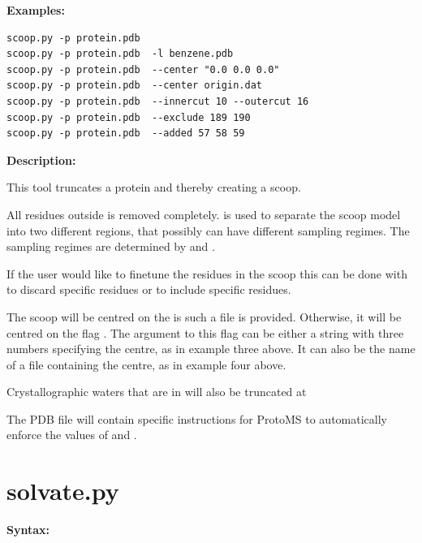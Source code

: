 \documentclass[letterpaper,10pt,english]{manual}
\begin{document}
\textbf{Examples:}

\begin{Verbatim}[commandchars=@\[\]]
scoop.py -p protein.pdb
scoop.py -p protein.pdb  -l benzene.pdb
scoop.py -p protein.pdb  --center "0.0 0.0 0.0"
scoop.py -p protein.pdb  --center origin.dat
scoop.py -p protein.pdb  --innercut 10 --outercut 16
scoop.py -p protein.pdb  --exclude 189 190
scoop.py -p protein.pdb  --added 57 58 59
\end{Verbatim}

\textbf{Description:}

This tool truncates a protein and thereby creating a scoop.

All residues outside  is removed completely.  is used to separate the scoop model into two different regions, that possibly can have different sampling regimes. The sampling regimes are determined by  and .

If the user would like to finetune the residues in the scoop this can be done with  to discard specific residues or  to include specific residues.

The scoop will be centred on the  is such a file is provided. Otherwise, it will be centred on the flag . The argument to this flag can be either a string with three numbers specifying the centre, as in example three above. It can also be the name of a file containing the centre, as in example four above.

Crystallographic waters that are in  will also be truncated at 

The PDB file will contain specific instructions for ProtoMS to automatically enforce the values of   and .


\section{solvate.py}

\textbf{Syntax:}
\end{document}
